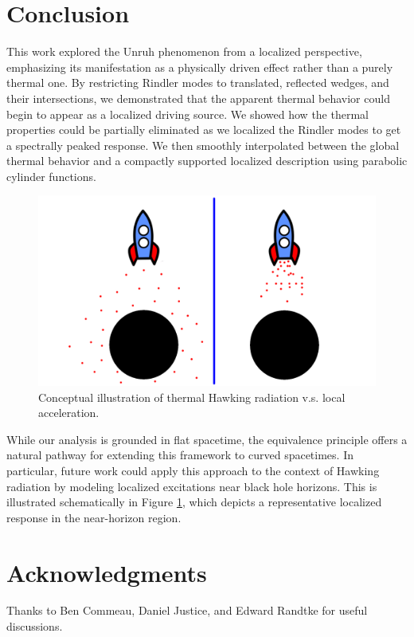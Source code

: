 \documentclass[12pt,a4paper]{article}
\begin{document}
\section{Conclusion}

This work explored the Unruh phenomenon from a localized perspective, emphasizing its manifestation as a physically driven effect rather than a purely thermal one. By restricting Rindler modes to translated, reflected wedges, and their intersections, we demonstrated that the apparent thermal behavior could begin to appear as a localized driving source. We showed how the thermal properties could be partially eliminated as we localized the Rindler modes to get a spectrally peaked response. We then smoothly interpolated between the global thermal behavior and a compactly supported localized description using parabolic cylinder functions.

\begin{figure}[h]
\centering
\includegraphics[scale=0.5]{rocket.png}
\caption{Conceptual illustration of thermal Hawking radiation v.s. local acceleration.}
\label{rocket}
\end{figure}

While our analysis is grounded in flat spacetime, the equivalence principle offers a natural pathway for extending this framework to curved spacetimes. In particular, future work could apply this approach to the context of Hawking radiation by modeling localized excitations near black hole horizons. This is illustrated schematically in Figure \ref{rocket}, which depicts a representative localized response in the near-horizon region.

\section{Acknowledgments}
Thanks to Ben Commeau, Daniel Justice, and Edward Randtke for useful discussions.



\end{document}
